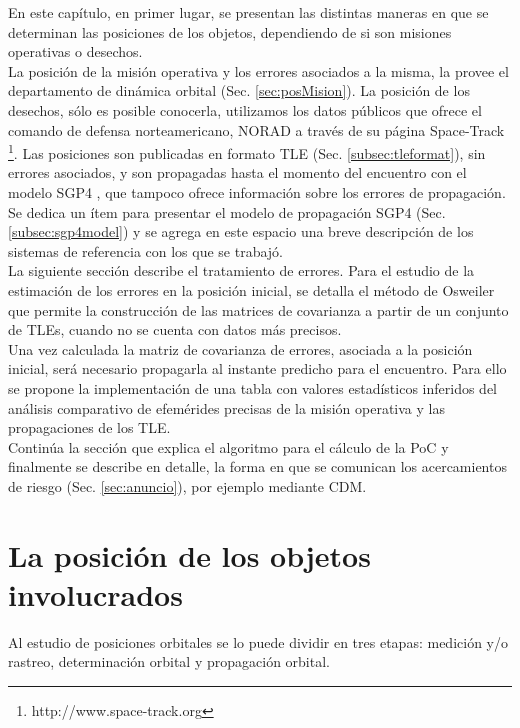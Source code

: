 En este cap\'itulo, en primer lugar, se presentan las distintas maneras en que se determinan las posiciones de los objetos, dependiendo de si son misiones operativas o desechos.\\
La posici\'on de la misi\'on operativa y los errores asociados a la misma, la provee el departamento de din\'amica orbital (Sec. \ref{sec:posMision}).
La posici\'on de los desechos, s\'olo es posible conocerla, utilizamos los datos p\'ublicos que ofrece el comando de defensa norteamericano, \ac{NORAD} a trav\'es de su p\'agina Space-Track {\footnote{http://www.space-track.org}}. Las posiciones son publicadas en formato \ac{TLE} (Sec. \ref{subsec:tleformat}), sin errores asociados, y son propagadas hasta el momento del encuentro con el modelo SGP4  \citep{hoots1980models}, que tampoco ofrece informaci\'on sobre los errores de propagaci\'on. Se dedica un \'item para presentar el modelo de propagaci\'on SGP4 (Sec. \ref{subsec:sgp4model}) y se agrega en este espacio una breve descripci\'on de los sistemas de referencia con los que se trabaj\'o.\\

La siguiente secci\'on describe el tratamiento de errores. Para el estudio de la estimaci\'on de los errores en la posici\'on inicial, se detalla el m\'etodo de Osweiler \citep{osweiler} que permite la construcci\'on de las matrices de covarianza a partir de un conjunto de TLEs, cuando no se cuenta con datos m\'as precisos.\\
Una vez calculada la matriz de covarianza de errores, asociada a la posici\'on inicial, ser\'a necesario propagarla al instante predicho para el encuentro. Para ello se propone la implementaci\'on de una tabla con valores estad\'isticos inferidos del an\'alisis comparativo de efem\'erides precisas de la misi\'on operativa y las propagaciones de los TLE.\\
Contin\'ua la secci\'on que explica el algoritmo para el c\'alculo de la PoC y finalmente se describe en detalle, la forma en que se comunican los acercamientos de riesgo (Sec. \ref{sec:anuncio}), por ejemplo mediante \ac{CDM}.


\section{La posici\'on de los objetos involucrados}{\label{sec:posMision}}
Al estudio de posiciones orbitales se lo puede dividir en tres etapas: medici\'on y/o rastreo, determinaci\'on orbital y propagaci\'on orbital.

